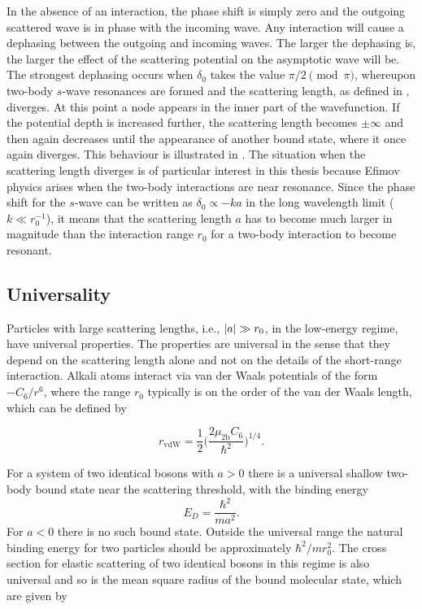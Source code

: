 In the absence of an interaction, the phase shift is simply zero and the outgoing scattered wave is in phase with the incoming wave. Any interaction will cause a dephasing between the outgoing and incoming waves. The larger the dephasing is, the larger the effect of the scattering potential on the asymptotic wave will be. The strongest dephasing occurs when $\delta_0$ takes the value $\pi/2 \pmod{\pi}$, whereupon two-body $s$-wave resonances are formed and the scattering length, as defined in , diverges. At this point a node appears in the inner part of the wavefunction. If the potential depth is increased further, the scattering length becomes $\pm \infty$ and then again decreases until the appearance of another bound state, where it once again diverges. This behaviour is illustrated in . The situation when the scattering length diverges is of particular interest in this thesis because Efimov physics arises when the two-body interactions are near resonance. Since the phase shift for the $s$-wave can be written as $\delta_0 \propto -ka$ in the long wavelength limit ($k \ll r_0^{-1}$), it means that the scattering length $a$ has to become much larger in magnitude than the interaction range $r_0$ for a two-body interaction to become resonant.

\subsection{Universality}\label{sec:universality}
Particles with large scattering lengths, i.e., $\lvert a\rvert\gg r_0$, in the low-energy regime, have universal properties. The properties are universal in the sense that they depend on the scattering length alone and not on the details of the short-range interaction. Alkali atoms interact via van der Waals potentials of the form $-C_6/r^6$, where the range $r_0$ typically is on the order of the van der Waals length, which can be defined by \cite{vanderWaals}

\begin{equation}
r_{\mathrm{vdW}} = \frac{1}{2}\bigg(\frac{2\mu_{2\mathrm{b}} C_6}{\hbar^2}\bigg)^{1/4}.
\end{equation}

For a system of two identical bosons with $a>0$ there is a universal shallow two-body bound state near the scattering threshold, with the binding energy 
\begin{equation}\label{shallowdimer}
E_D = \frac{\hbar^2}{ma^2}.
\end{equation}
For $a<0$ there is no such bound state. Outside the universal range the natural binding energy for two particles should be approximately $\hbar^2/mr_0^2$. The cross section for elastic scattering of two identical bosons in this regime is also universal and so is the mean square radius of the bound molecular state, which are given by

